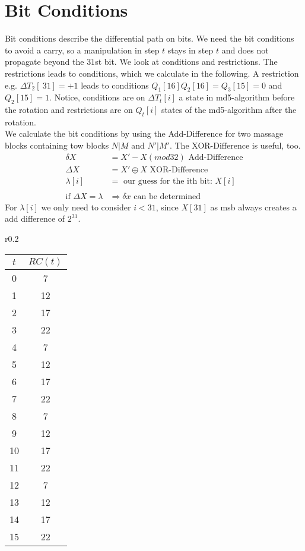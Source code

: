 \section{Bit Conditions}
Bit conditions describe the differential path on bits. 
We need the bit conditions to avoid a carry, so a manipulation in step $t$ stays in step $t$ and does not propagate beyond the $31$st bit.
We look at conditions and restrictions. The restrictions leads to conditions, which we calculate in the following.
A restriction e.g. $\Delta T_2 \left[\ 31 \right] = +1 $ leads to conditions $ Q_1\left[ 16 \right] Q_2\left[ 16 \right] = Q_3\left[ 15 \right] = 0 $ and $ Q_2[15] = 1$.
Notice, conditions are on $\Delta T_t[i]$ a state in md5-algorithm before the rotation and restrictions are on $Q_t[i]$ states of the md5-algorithm after the rotation.\\ 
We calculate the bit conditions by using the Add-Difference for two massage blocks containing tow blocks $N|M$ and $N'|M'$. The XOR-Difference is useful, too.
\begin{align*}
    \delta X &= X' - X \left( mod32 \right) \text{ Add-Difference}\\
    \Delta X &= X' \oplus X \text{ XOR-Difference}\\
    \lambda \left[i\right] &= \text{ our guess for the ith bit: } X\left[i\right] \\
    \\
    \text{if } \Delta X = \lambda &\Rightarrow \delta x \text{ can be determined}
\end{align*}
For $\lambda \left[i\right]$ we only need to consider $i < 31$, since $X \left[ 31 \right]$ as msb always creates a add difference of $2^{31}$.\\
\begin{wrapfigure}[]{r}{0.2\textwidth}
        \begin{tabular}{| c | c |}
            \hline
            $t$ & $RC(t)$    \\
            \hline
            \hline
            0  & 7 \\
            1  & 12 \\
            2  & 17 \\
            3  & 22 \\
            4  & 7 \\
            5  & 12 \\
            6  & 17 \\
            7  & 22 \\
            8  & 7 \\
            9  & 12 \\
            10 & 17 \\
            11 & 22 \\
            12 & 7 \\
            13 & 12 \\
            14 & 17 \\
            15 & 22 \\
            \hline
        \end{tabular}
        \label{RC}
    \end{wrapfigure}
